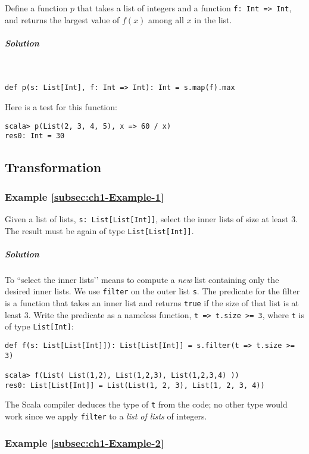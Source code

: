 Define a function $p$ that takes a list of integers and a function
\lstinline!f: Int => Int!, and returns the largest value of $f(x)$
among all $x$ in the list.

\subparagraph{Solution}

~

\begin{lstlisting}
def p(s: List[Int], f: Int => Int): Int = s.map(f).max
\end{lstlisting}
Here is a test for this function:
\begin{lstlisting}
scala> p(List(2, 3, 4, 5), x => 60 / x)
res0: Int = 30
\end{lstlisting}


\subsection{Transformation}

\subsubsection{Example \label{subsec:ch1-Example-1}\ref{subsec:ch1-Example-1}}

Given a list of lists, \lstinline!s: List[List[Int]]!, select the
inner lists of size at least $3$. The result must be again of type
\lstinline!List[List[Int]]!. 

\subparagraph{Solution}

To \textsf{``}select the inner lists\textsf{'}' means to compute a \emph{new} list
containing only the desired inner lists. We use \texttt{}\lstinline!filter!
on the outer list \lstinline!s!. The predicate for the filter is
a function that takes an inner list and returns \texttt{}\lstinline!true!
if the size of that list is at least $3$. Write the predicate as
a nameless function, \lstinline!t => t.size >= 3!, where \texttt{}\lstinline!t!
is of type \lstinline!List[Int]!:
\begin{lstlisting}
def f(s: List[List[Int]]): List[List[Int]] = s.filter(t => t.size >= 3)

scala> f(List( List(1,2), List(1,2,3), List(1,2,3,4) ))
res0: List[List[Int]] = List(List(1, 2, 3), List(1, 2, 3, 4)) 
\end{lstlisting}
The Scala compiler deduces the type of \lstinline!t! from the code;
no other type would work since we apply \lstinline!filter! to a \emph{list
of lists} of integers.

\subsubsection{Example \label{subsec:ch1-Example-2}\ref{subsec:ch1-Example-2}}

